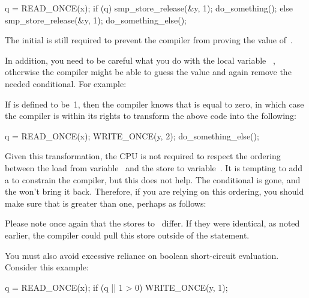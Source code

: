 \begin{VerbatimN}
q = READ_ONCE(x);
if (q) {
	smp_store_release(&y, 1);
	do_something();
} else {
	smp_store_release(&y, 1);
	do_something_else();
}
\end{VerbatimN}

The initial  is still required to prevent the compiler from
proving the value of~.

In addition, you need to be careful what you do with the local variable~%
,
otherwise the compiler might be able to guess the value and again remove
the needed conditional.
For example:


If  is defined to be~1, then the compiler knows that  is
equal to zero, in which case the compiler is within its rights to
transform the above code into the following:

\begin{VerbatimN}
q = READ_ONCE(x);
WRITE_ONCE(y, 2);
do_something_else();
\end{VerbatimN}

Given this transformation, the CPU is not required to respect the ordering
between the load from variable~ and the store to variable~.
It is tempting to add a  to constrain the compiler,
but this does not help.
The conditional is gone, and the  won't bring it back.
Therefore, if you are relying on this ordering, you should make sure
that  is greater than one, perhaps as follows:


Please note once again that the stores to~ differ.
If they were identical, as noted earlier, the compiler could pull this
store outside of the  statement.

You must also avoid excessive reliance on boolean short-circuit evaluation.
Consider this example:

\begin{VerbatimN}
q = READ_ONCE(x);
if (q || 1 > 0)
	WRITE_ONCE(y, 1);
\end{VerbatimN}

